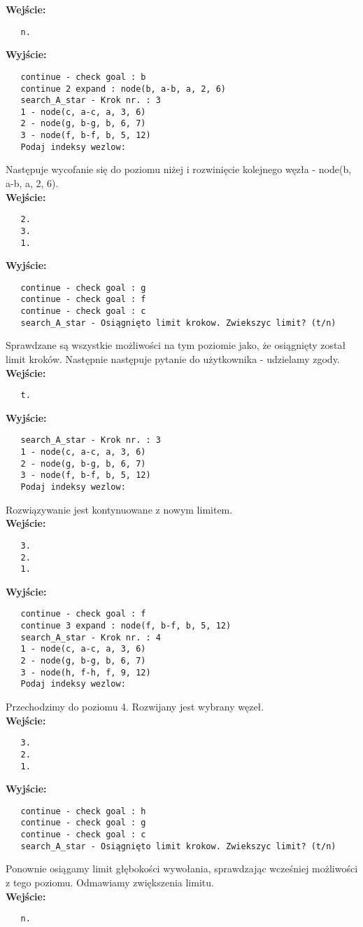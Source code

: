\documentclass[11pt]{article} %
\begin{document}
\textbf{Wejście:}
\begin{verbatim}
   n.
\end{verbatim}
\textbf{Wyjście:}
\begin{verbatim}
   continue - check goal : b
   continue 2 expand : node(b, a-b, a, 2, 6)
   search_A_star - Krok nr. : 3
   1 - node(c, a-c, a, 3, 6)
   2 - node(g, b-g, b, 6, 7)
   3 - node(f, b-f, b, 5, 12)
   Podaj indeksy wezlow:
\end{verbatim}
Następuje wycofanie się do poziomu niżej i rozwinięcie kolejnego węzła - node(b, a-b, a, 2, 6).\\
\textbf{Wejście:}
\begin{verbatim}
   2.
   3.
   1.
\end{verbatim}
\textbf{Wyjście:}
\begin{verbatim}
   continue - check goal : g
   continue - check goal : f
   continue - check goal : c
   search_A_star - Osiągnięto limit krokow. Zwiekszyc limit? (t/n)
\end{verbatim}
Sprawdzane są wszystkie możliwości na tym poziomie jako, że osiągnięty został limit kroków. Następnie następuje pytanie do użytkownika - udzielamy zgody.\\
\textbf{Wejście:}
\begin{verbatim}
   t.
\end{verbatim}
\textbf{Wyjście:}
\begin{verbatim}
   search_A_star - Krok nr. : 3
   1 - node(c, a-c, a, 3, 6)
   2 - node(g, b-g, b, 6, 7)
   3 - node(f, b-f, b, 5, 12)
   Podaj indeksy wezlow:
\end{verbatim}
Rozwiązywanie jest kontynuowane z nowym limitem.\\
\textbf{Wejście:}
\begin{verbatim}
   3.
   2.
   1.
\end{verbatim}
\textbf{Wyjście:}
\begin{verbatim}
   continue - check goal : f
   continue 3 expand : node(f, b-f, b, 5, 12)
   search_A_star - Krok nr. : 4
   1 - node(c, a-c, a, 3, 6)
   2 - node(g, b-g, b, 6, 7)
   3 - node(h, f-h, f, 9, 12)
   Podaj indeksy wezlow:
\end{verbatim}
Przechodzimy do poziomu 4. Rozwijany jest wybrany węzeł.\\
\textbf{Wejście:}
\begin{verbatim}
   3.
   2.
   1.
\end{verbatim}
\textbf{Wyjście:}
\begin{verbatim}
   continue - check goal : h
   continue - check goal : g
   continue - check goal : c
   search_A_star - Osiągnięto limit krokow. Zwiekszyc limit? (t/n)
\end{verbatim}
Ponownie osiągamy limit głębokości wywołania, sprawdzając wcześniej możliwości z tego poziomu. Odmawiamy zwiększenia limitu.\\
\textbf{Wejście:}
\begin{verbatim}
   n.
\end{verbatim}
\end{document}
